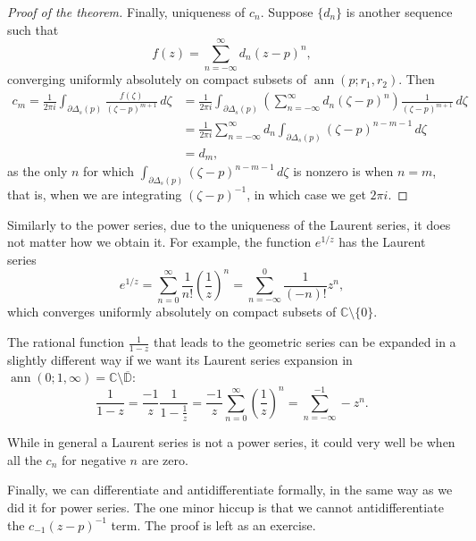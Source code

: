 \documentclass[12pt,openany]{book}
\newcommand{\ann}{\operatorname{ann}}
\newcommand{\C}{{\mathbb{C}}}
\newcommand{\D}{{\mathbb{D}}}
\theoremstyle{plain}
\theoremstyle{remark}
\theoremstyle{definition}
\theoremstyle{exercise}
\theoremstyle{example}
\begin{document}
\begin{proof}[Proof of the theorem]
Finally, uniqueness of $c_n$.  Suppose $\{ d_n \}$ is another sequence such
that
\begin{equation*}
f(z)
=
\sum_{n=-\infty}^{\infty} d_n {(z-p)}^{n} ,
\end{equation*}
converging uniformly absolutely on compact subsets of $\ann(p;r_1,r_2)$.
Then
\begin{equation*}
\begin{split}
c_m = \frac{1}{2\pi i}
\int_{\partial \Delta_{s}(p)} \frac{f(\zeta)}{{(\zeta-p)}^{m+1}}
 \, d\zeta 
& =
\frac{1}{2\pi i}
\int_{\partial \Delta_{s}(p)}
\left(\sum_{n=-\infty}^{\infty} d_n {(\zeta-p)}^{n} \right)
\frac{1}{{(\zeta-p)}^{m+1}}
 \, d\zeta 
\\
& =
\frac{1}{2\pi i}
\sum_{n=-\infty}^{\infty}
d_n
\int_{\partial \Delta_{s}(p)}
{(\zeta-p)}^{n-m-1}
 \, d\zeta 
\\
& =
d_m ,
\end{split}
\end{equation*}
as the only $n$ for which
$\int_{\partial \Delta_{s}(p)}
{(\zeta-p)}^{n-m-1}
 \, d\zeta$ is nonzero is when $n=m$, that is, when we are integrating
${(\zeta-p)}^{-1}$, in which case we get $2 \pi i$.
\end{proof}

Similarly to the power series, due to the uniqueness of the Laurent series,
it does not matter how we obtain it.  For example, the function $e^{1/z}$
has the Laurent series
\begin{equation*}
e^{1/z}
=
\sum_{n=0}^{\infty} \frac{1}{n!} {\left(\frac{1}{z}\right)}^n
=
\sum_{n=-\infty}^0 \frac{1}{(-n)!} z^n ,
\end{equation*}
which converges uniformly absolutely on compact subsets of
$\C \setminus \{ 0 \}$.

The rational function $\frac{1}{1-z}$ that leads to the geometric series can
be expanded in a slightly different way if we want its Laurent series
expansion in $\ann(0;1,\infty) = \C \setminus \overline{\D}$:
\begin{equation*}
\frac{1}{1-z}
=
\frac{-1}{z}
\frac{1}{1-\frac{1}{z}}
=
\frac{-1}{z}
\sum_{n=0}^\infty
{\left(\frac{1}{z}\right)}^n
=
\sum_{n=-\infty}^{-1}
- z^{n} .
\end{equation*}

While in general a Laurent series is not a power series,
it could very well be when all the $c_n$ for negative $n$ are zero.

\medskip

Finally, we can differentiate and antidifferentiate
formally, in the same way as we did it for power series.  The one minor
hiccup is that we cannot antidifferentiate the $c_{-1}{(z-p)}^{-1}$ term.
The proof is left as an exercise.
\end{document}
